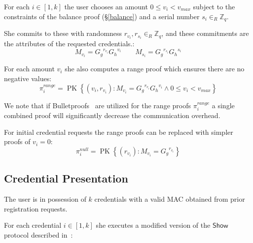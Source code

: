 \documentclass{article}
\begin{document}
For each $i \in [1, k]$ the user chooses an amount $0 \leq v_i < v_{\mathit{max}}$ subject to the constraints of the balance proof (\S\ref{balance}) and a serial number $s_i \in_R \mathbb{Z}_q$.

She commits to these with randomness $r_{v_i}, r_{s_i} \in_R \mathbb{Z}_q$, and these commitments are the attributes of the requested credentials.:
\[ M_{v_i}={G_g}^{r_{v_i}}{G_h}^{v_i} \qquad M_{s_i}={G_g}^{r_{s_i}}{G_h}^{s_i} \]

For each amount $v_i$ she also computes a range proof which ensures there are no negative values:
\[
\pi^{\mathit{range}}_i = \operatorname{PK}\left\{\left(v_i, r_{v_i} \right) :
M_{v_i} = {G_g}^{r_{v_i}}{G_h}^{v_i}
\land
0 \leq v_i < v_{\mathit{max}} \right\}
\]

We note that if Bulletproofs~\cite{bunz2018bulletproofs} are utilized for the range proofs $\pi^{\textit{range}}_i$ a single combined proof will significantly decrease the communication overhead.

For initial credential requests the range proofs can be replaced with simpler proofs of $v_i = 0$:
\[
  \pi^{\mathit{null}}_i = \operatorname{PK}\left\{ \left( r_{v_i}\right) :
    M_{v_i} = {G_{g}}^{r_{v_i}}
  \right\}
\]

\subsection{Credential Presentation}

The user is in possession of $k$ credentials with a valid MAC obtained from prior registration requests.

For each credential $i \in [1, k]$ she executes a modified version of the $\mathsf{Show}$ protocol described in~\cite{chase2019signal}:
\end{document}
